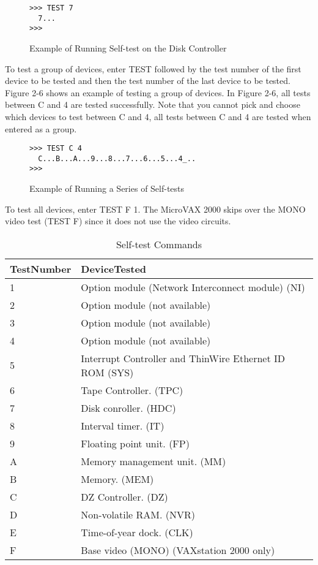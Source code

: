 \begin{figure}[H]
\caption{Example of Running Self-test on the Disk Controller}
\begin{verbatim}
>>> TEST 7
  7...
>>>
\end{verbatim}
\end{figure}
\label{figure:2-4}

To test a group of devices, enter TEST followed by the test number of the
first device to be tested and then the test number of the last device to be
tested. Figure 2-6 shows an example of testing a group of devices. In Figure
2-6, all tests between C and 4 are tested successfully. Note that you cannot
pick and choose which devices to test between C and 4, all tests between
C and 4 are tested when entered as a group.

\begin{figure}[H]
\caption{Example of Running a Series of Self-tests}
\begin{verbatim}
>>> TEST C 4
  C...B...A...9...8...7...6...5...4_..
>>>
\end{verbatim}
\end{figure}
\label{figure:2-5}

To test all devices, enter TEST F 1. The MicroVAX 2000 skips over the
MONO video test (TEST F) since it does not use the video circuits.

\begin{table}[H]
\caption{Self-test Commands}
\label{table:2-3}
\begin{tabularx}{\textwidth}{p{2cm} p{8cm}}
\hline
\raggedright\textbf{Test\newline Number} & \textbf{Device\newline Tested} \\
\hline
1 & Option module (Network Interconnect module) (NI) \\
2 & Option module (not available) \\
3 & Option module (not available) \\
4 & Option module (not available) \\
5 & Interrupt Controller and ThinWire Ethernet ID ROM (SYS) \\
6 & Tape Controller. (TPC) \\
7 & Disk conroller. (HDC) \\
8 & Interval timer. (IT) \\
9 & Floating point unit. (FP) \\
A & Memory management unit. (MM) \\
B & Memory. (MEM) \\
C & DZ Controller. (DZ) \\
D & Non-volatile RAM. (NVR) \\
E & Time-of-year dock. (CLK) \\
F & Base video (MONO) (VAXstation 2000 only) \\
\hline
\end{tabularx}
\end{table}

